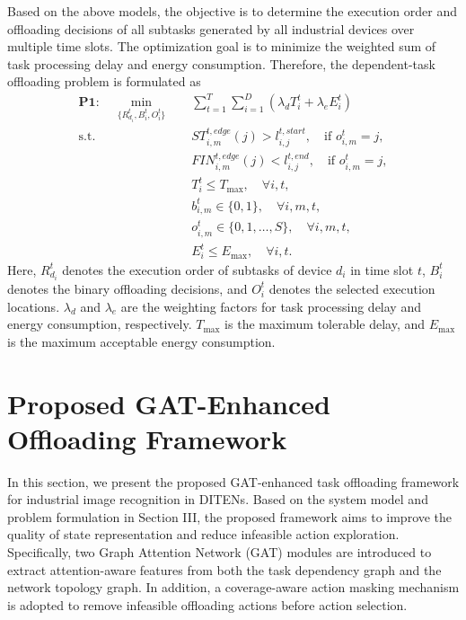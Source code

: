 \documentclass[conference]{IEEEtran}
\begin{document}
Based on the above models, the objective is to determine the execution order and offloading decisions of all subtasks generated by all industrial devices over multiple time slots. The optimization goal is to minimize the weighted sum of task processing delay and energy consumption. Therefore, the dependent-task offloading problem is formulated as
\begin{equation}
\begin{aligned}
\mathbf{P1}: \quad
\min_{\{R_{d_i}^t,B_i^t,O_i^t\}} \quad
&
\sum_{t=1}^{T}
\sum_{i=1}^{D}
\left(
\lambda_d T_i^t
+
\lambda_e E_i^t
\right) \\
\mathrm{s.t.} \quad
&
ST_{i,m}^{t,edge}(j)
>
l_{i,j}^{t,start},
\quad
\text{if } o_{i,m}^t=j, \\
&
FIN_{i,m}^{t,edge}(j)
<
l_{i,j}^{t,end},
\quad
\text{if } o_{i,m}^t=j, \\
&
T_i^t\leq T_{\max},
\quad \forall i,t, \\
&
b_{i,m}^t\in\{0,1\},
\quad \forall i,m,t, \\
&
o_{i,m}^t\in\{0,1,\ldots,S\},
\quad \forall i,m,t, \\
&
E_i^t\leq E_{\max},
\quad \forall i,t.
\end{aligned}
\end{equation}
Here, $R_{d_i}^t$ denotes the execution order of subtasks of device $d_i$ in time slot $t$, $B_i^t$ denotes the binary offloading decisions, and $O_i^t$ denotes the selected execution locations. $\lambda_d$ and $\lambda_e$ are the weighting factors for task processing delay and energy consumption, respectively. $T_{\max}$ is the maximum tolerable delay, and $E_{\max}$ is the maximum acceptable energy consumption.

\section{Proposed GAT-Enhanced Offloading Framework}

In this section, we present the proposed GAT-enhanced task offloading framework for industrial image recognition in DITENs. Based on the system model and problem formulation in Section III, the proposed framework aims to improve the quality of state representation and reduce infeasible action exploration. Specifically, two Graph Attention Network (GAT) modules are introduced to extract attention-aware features from both the task dependency graph and the network topology graph. In addition, a coverage-aware action masking mechanism is adopted to remove infeasible offloading actions before action selection.
\end{document}
